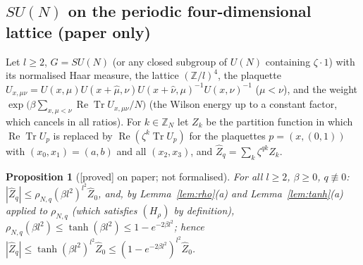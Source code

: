 \documentclass[11pt,a4paper]{article}
\theoremstyle{plain}
\newtheorem{proposition}[theorem]{Proposition}
\theoremstyle{definition}
\theoremstyle{remark}
\numberwithin{equation}{section}
\newcommand{\st}[1]{\textsf{[#1]}}
\begin{document}
\subsection{$SU(N)$ on the periodic four-dimensional lattice (paper only)}\label{sec:zn-sun}
Let $l\ge2$, $G=SU(N)$ (or any closed subgroup of $U(N)$ containing $\zeta\cdot1$) with its normalised Haar measure, the lattice $(\mathbb Z/l)^4$, the plaquette $U_{x,\mu\nu}=U(x,\mu)U(x{+}\hat\mu,\nu)U(x{+}\hat\nu,\mu)^{-1}U(x,\nu)^{-1}$ ($\mu<\nu$), and the weight $\exp\bigl(\beta\sum_{x,\mu<\nu}\operatorname{Re}\operatorname{Tr}U_{x,\mu\nu}/N\bigr)$ (the Wilson energy up to a constant factor, which cancels in all ratios). For $k\in\mathbb Z_N$ let $Z_k$ be the partition function in which $\operatorname{Re}\operatorname{Tr}U_p$ is replaced by $\operatorname{Re}(\zeta^k\operatorname{Tr}U_p)$ for the plaquettes $p=(x,(0,1))$ with $(x_0,x_1)=(a,b)$ and all $(x_2,x_3)$, and $\hat Z_q=\sum_k\zeta^{qk}Z_k$.
\begin{proposition}[\st{proved} on paper; not formalised]\label{prop:zn-sun}
For all $l\ge2$, $\beta\ge0$, $q\not\equiv0$: $|\hat Z_q|\le\rho_{N,q}(\beta l^2)^{l^2}\hat Z_0$, and, by Lemma~\ref{lem:rho}(a) and Lemma~\ref{lem:tanh}(a) applied to $\rho_{N,q}$ (which satisfies $(H_\rho)$ by definition), $\rho_{N,q}(\beta l^2)\le\tanh(\beta l^2)\le1-e^{-2\beta l^2}$; hence $|\hat Z_q|\le\tanh(\beta l^2)^{l^2}\hat Z_0\le(1-e^{-2\beta l^2})^{l^2}\hat Z_0$.
\end{proposition}
\end{document}
